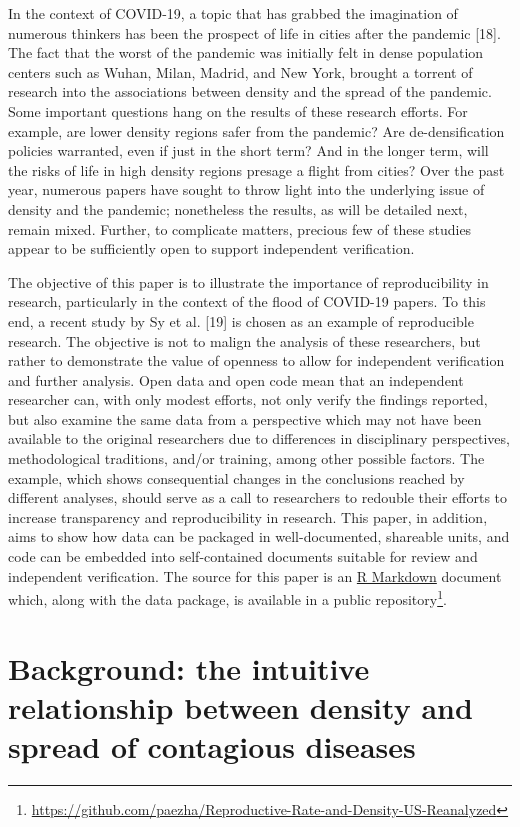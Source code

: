 \documentclass[10pt,letterpaper]{article}
\begin{document}
In the context of COVID-19, a topic that has grabbed the imagination of
numerous thinkers has been the prospect of life in cities after the
pandemic {[}18{]}. The fact that the worst of the pandemic was initially
felt in dense population centers such as Wuhan, Milan, Madrid, and New
York, brought a torrent of research into the associations between
density and the spread of the pandemic. Some important questions hang on
the results of these research efforts. For example, are lower density
regions safer from the pandemic? Are de-densification policies
warranted, even if just in the short term? And in the longer term, will
the risks of life in high density regions presage a flight from cities?
Over the past year, numerous papers have sought to throw light into the
underlying issue of density and the pandemic; nonetheless the results,
as will be detailed next, remain mixed. Further, to complicate matters,
precious few of these studies appear to be sufficiently open to support
independent verification.

The objective of this paper is to illustrate the importance of
reproducibility in research, particularly in the context of the flood of
COVID-19 papers. To this end, a recent study by Sy et al. {[}19{]} is
chosen as an example of reproducible research. The objective is not to
malign the analysis of these researchers, but rather to demonstrate the
value of openness to allow for independent verification and further
analysis. Open data and open code mean that an independent researcher
can, with only modest efforts, not only verify the findings reported,
but also examine the same data from a perspective which may not have
been available to the original researchers due to differences in
disciplinary perspectives, methodological traditions, and/or training,
among other possible factors. The example, which shows consequential
changes in the conclusions reached by different analyses, should serve
as a call to researchers to redouble their efforts to increase
transparency and reproducibility in research. This paper, in addition,
aims to show how data can be packaged in well-documented, shareable
units, and code can be embedded into self-contained documents suitable
for review and independent verification. The source for this paper is an
\href{http://rmarkdown.rstudio.com}{R Markdown} document which, along
with the data package, is available in a public repository\footnote{\url{https://github.com/paezha/Reproductive-Rate-and-Density-US-Reanalyzed}}.

\hypertarget{background-the-intuitive-relationship-between-density-and-spread-of-contagious-diseases}{%
\section{Background: the intuitive relationship between density and
spread of contagious
diseases}\label{background-the-intuitive-relationship-between-density-and-spread-of-contagious-diseases}}
\end{document}
